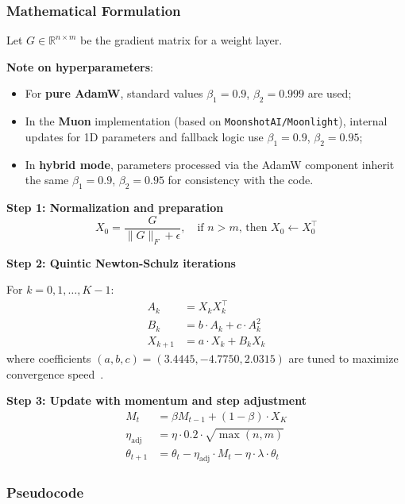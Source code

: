 \documentclass[a4paper,12pt]{article}
\begin{document}
\subsubsection{Mathematical Formulation}

Let $G \in \mathbb{R}^{n \times m}$ be the gradient matrix for a weight layer.

\textbf{Note on hyperparameters}: 
\begin{itemize}
    \item For \textbf{pure AdamW}, standard values $\beta_1 = 0.9$, $\beta_2 = 0.999$ are used;
    \item In the \textbf{Muon} implementation (based on \texttt{MoonshotAI/Moonlight}), internal updates for 1D parameters and fallback logic use $\beta_1 = 0.9$, $\beta_2 = 0.95$;
    \item In \textbf{hybrid mode}, parameters processed via the AdamW component inherit the same $\beta_1 = 0.9$, $\beta_2 = 0.95$ for consistency with the code.
\end{itemize}

\textbf{Step 1: Normalization and preparation}
\begin{equation}
    X_0 = \frac{G}{\|G\|_F + \epsilon}, \quad \text{if } n > m \text{, then } X_0 \gets X_0^\top
\end{equation}

\textbf{Step 2: Quintic Newton-Schulz iterations}

For $k = 0, 1, \ldots, K-1$:
\begin{align}
    A_k &= X_k X_k^\top \\
    B_k &= b \cdot A_k + c \cdot A_k^2 \\
    X_{k+1} &= a \cdot X_k + B_k X_k
\end{align}
where coefficients $(a, b, c) = (3.4445, -4.7750, 2.0315)$ are tuned to maximize convergence speed~\cite{moonshot2024muon}.

\textbf{Step 3: Update with momentum and step adjustment}
\begin{align}
    M_t &= \beta M_{t-1} + (1 - \beta) \cdot X_K \\
    \eta_{\text{adj}} &= \eta \cdot 0.2 \cdot \sqrt{\max(n, m)} \\
    \theta_{t+1} &= \theta_t - \eta_{\text{adj}} \cdot M_t - \eta \cdot \lambda \cdot \theta_t
\end{align}

\subsubsection{Pseudocode}
\end{document}
